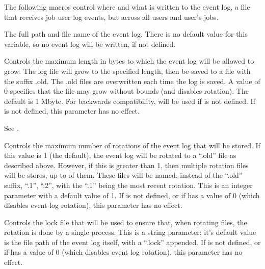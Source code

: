 The following macros control where and what is written to the 
event log,
a file that receives job user log events, 
but across all users and user's jobs.

\begin{description}

\label{param:EventLog}
\item[\Macro{EVENT\_LOG}]
  The full path and file name of the event log.
  There is no default value for this variable,
  so no event log will be written, if not defined.

\label{param:EventLogMaxSize}
\item[\Macro{EVENT\_LOG\_MAX\_SIZE}]
  Controls the maximum length in bytes to which the event log
  will be allowed to grow. The log file will grow to the specified length,
  then be saved to a file with the suffix .old.
  The .old  files are overwritten each time the log is saved.
  A value of 0 specifies that the file may grow without bounds (and
  disables rotation).   The default is 1 Mbyte.
  For backwards compatibility,  will be used if
   is not defined.
  If  is not defined, this parameter has no effect.

\label{param:MaxEventLog}
\item[\Macro{MAX\_EVENT\_LOG}]
  See .

\label{param:EventLogMaxRotations}
\item[\Macro{EVENT\_LOG\_MAX\_ROTATIONS}]
  Controls the maximum number of rotations of the event log that
  will be stored.  If this value is 1 (the default), the event log
  will be rotated to a ``.old'' file as described above.  However, if
  this is greater than 1, then multiple rotation files will be stores,
  up to  of them.  These files
  will be named, instead of the ``.old'' suffix, ``.1'', ``.2'', with
  the ``.1'' being the most recent rotation.  This is an integer
  parameter with a default value of 1.
  If  is not defined, or if
   has a value of 0 (which disables
  event log rotation), this parameter has no effect.

\label{param:EventLogRotationLock}
\item[\Macro{EVENT\_LOG\_ROTATION\_LOCK}]
  Controls the lock file that will be used to ensure that, when
  rotating files, the rotation is done by a single process.  This is a
  string parameter; it's default value is the file path of the
  event log itself, with a ``.lock'' appended.
  If  is not defined, or if
   has a value of 0 (which disables
  event log rotation), this parameter has no effect.


\end{description}
